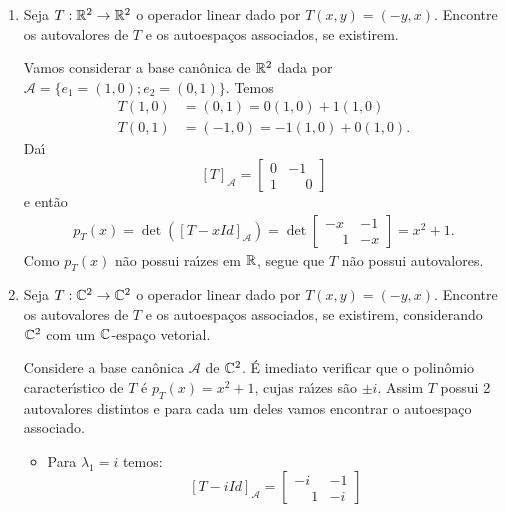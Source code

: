 \begin{exemplo}
    \begin{enumerate}[label={\arabic*})]
        \item Seja $T : \mathbb{R}^2 \to \mathbb{R}^2$ o operador linear dado por $T(x,y) = (-y,x)$. Encontre os autovalores de $T$ e os autoespa\c{c}os associados, se existirem.
        \begin{solucao}
            Vamos considerar a base can\^onica de $\mathbb{R}^2$ dada por $\mathcal{A} = \{e_1 = (1,0); e_2 = (0,1)\}$. Temos
            \begin{align}
                T(1,0) &= (0,1) = 0(1,0) + 1(1,0)\\
                T(0,1) &= (-1,0) = -1(1,0) + 0(1,0).
            \end{align}
            Da{\'\i}
            \[
                [T]_\mathcal{A} = \begin{bmatrix}0 & -1\\ 1 & \phantom{-}0\end{bmatrix}
            \]
            e ent\~ao
            \begin{align*}
                p_T(x) = \det([T - xId]_\mathcal{A}) = \det\begin{bmatrix} -x & -1\\\phantom{-}1 & -x\end{bmatrix} = x^2 + 1.
            \end{align*}
            Como $p_T(x)$ n\~ao possui ra{\'\i}zes em $\mathbb{R}$, segue que $T$ n\~ao possui autovalores.
        \end{solucao}
        \item Seja $T : \mathbb{C}^2 \to \mathbb{C}^2$ o operador linear dado por $T(x,y) = (-y,x)$. Encontre os autovalores de $T$ e os autoespa\c{c}os associados, se existirem, considerando $\mathbb{C}^2$ com um $\mathbb{C}$-espa\c{c}o vetorial.
        \begin{solucao}
            Considere a base can\^onica $\mathcal{A}$ de $\mathbb{C}^2$. \'E imediato verificar que o polin\^omio caracter{\'\i}stico de $T$ \'e $p_T(x) = x^2 + 1$, cujas ra{\'\i}zes s\~ao $\pm i$. Assim $T$ possui 2 autovalores distintos e para cada um deles vamos encontrar o autoespa\c{c}o associado.
            \begin{itemize}
                \item Para $\lambda_1 = i$ temos:
                \[
                    [T - iId]_\mathcal{A} = \begin{bmatrix} -i & -1\\\phantom{-}1 & -i\end{bmatrix}
\]
\end{itemize}
\end{solucao}
\end{enumerate}
\end{exemplo}
